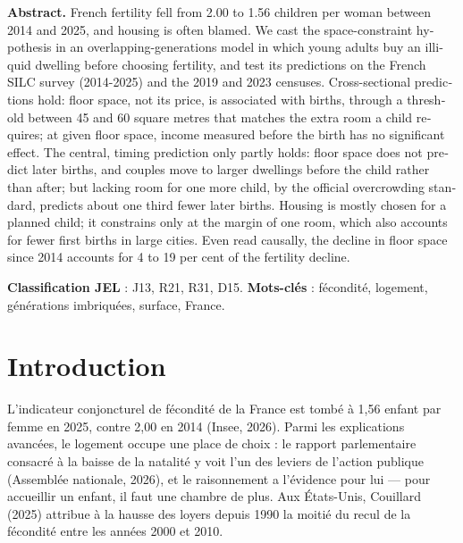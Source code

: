 \documentclass[11pt,a4paper]{article}
\theoremstyle{plain}
\theoremstyle{definition}
\theoremstyle{remark}
\begin{document}
\begin{center}
\begin{minipage}{0.88\linewidth}\small
\begin{otherlanguage}{english}\textbf{Abstract.} French fertility fell from 2.00 to 1.56 children per woman between 2014 and 2025, and housing is often blamed. We cast the space-constraint hypothesis in an overlapping-generations model in which young adults buy an illiquid dwelling before choosing fertility, and test its predictions on the French SILC survey (2014-2025) and the 2019 and 2023 censuses. Cross-sectional predictions hold: floor space, not its price, is associated with births, through a threshold between 45 and 60 square metres that matches the extra room a child requires; at given floor space, income measured before the birth has no significant effect. The central, timing prediction only partly holds: floor space does not predict later births, and couples move to larger dwellings before the child rather than after; but lacking room for one more child, by the official overcrowding standard, predicts about one third fewer later births. Housing is mostly chosen for a planned child; it constrains only at the margin of one room, which also accounts for fewer first births in large cities. Even read causally, the decline in floor space since 2014 accounts for 4 to 19 per cent of the fertility decline.\end{otherlanguage}

\medskip
\textbf{Classification JEL} : J13, R21, R31, D15. \quad
\textbf{Mots-clés} : fécondité, logement, générations imbriquées, surface, France.
\end{minipage}
\end{center}

\newpage

\section{Introduction}

L'indicateur conjoncturel de fécondité de la France est tombé à 1,56 enfant par femme en 2025, contre 2,00 en 2014 (Insee, 2026). Parmi les explications avancées, le logement occupe une place de choix : le rapport parlementaire consacré à la baisse de la natalité y voit l'un des leviers de l'action publique (Assemblée nationale, 2026), et le raisonnement a l'évidence pour lui — pour accueillir un enfant, il faut une chambre de plus. Aux États-Unis, Couillard (2025) attribue à la hausse des loyers depuis 1990 la moitié du recul de la fécondité entre les années 2000 et 2010.
\end{document}
